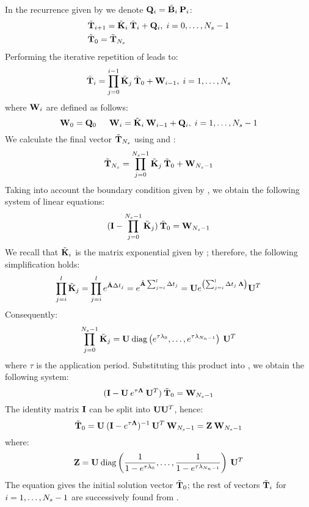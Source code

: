 In the recurrence given by  we denote $\mathbf{Q}_i = \tilde{\mathbf{B}}_i \:
\mathbf{P}_i$:
\begin{align}
  & \tv{T}_{i + 1} = \tm{K}_i \: \tv{T}_i + \m{Q}_i, \; i = \range{0}{N_s - 1} \elab{ce-recurrent} \\
  & \tv{T}_0 = \tv{T}_{N_s} \nonumber
\end{align}
Performing the iterative repetition of  leads to:
\begin{equation} \elab{y-recurrent}
  \tv{T}_i = \prod_{j = 0}^{i - 1} \tm{K}_j \: \tv{T}_0 + \m{W}_{i - 1}, \; i = \range{1}{N_s}
\end{equation}
where $\mathbf{W}_i$ are defined as follows:
\begin{equation}
  \m{W}_0 = \m{Q}_0 \hspace{15pt} \m{W}_i = \tm{K}_i \: \m{W}_{i - 1} + \m{Q}_i, \; i = \range{1}{N_s - 1} \elab{p-recurrent}
\end{equation}
We calculate the final vector $\tilde{\mathbf{T}}_{N_s}$ using  and
:
\[
  \tilde{\mathbf{T}}_{N_s} = \prod_{j = 0}^{N_s - 1} \tilde{\mathbf{K}}_j \: \tilde{\mathbf{T}}_0 + \mathbf{W}_{N_s - 1}
\]
Taking into account the boundary condition given by ,
we obtain the following system of linear equations:
\begin{equation} \elab{core-system}
  (\m{I} - \prod_{j = 0}^{N_s - 1} \tm{K}_j) \: \tv{T}_0 = \m{W}_{N_s - 1}
\end{equation}
We recall that $\tilde{\mathbf{K}}_i$ is the matrix exponential given by
; therefore, the following simplification holds:
\[
  \prod_{j = i}^l \tilde{\mathbf{K}}_j = \prod_{j = i}^l e^{\tilde{\mathbf{A}} \Delta t_j} = e^{\tilde{\mathbf{A}} \sum_{j = i}^l \Delta t_j} = \mathbf{U} e^{\left( \sum_{j = i}^l \Delta t_j \: \mathbf{\Lambda} \right)} \mathbf{U}^T
\]
Consequently:
\[
  \prod_{j = 0}^{N_s - 1} \tilde{\mathbf{K}}_j = \mathbf{U} \: \mathrm{diag}\left(e^{\tau \lambda_0}, \dots, e^{\tau \lambda_{N_n - 1}}\right) \: \mathbf{U}^T
\]
where $\tau$ is the application period. Substituting this product into
, we obtain the following system:
\[
  (\mathbf{I} - \mathbf{U} \: e^{\tau \mathbf{\Lambda}} \: \mathbf{U}^T) \: \tilde{\mathbf{T}}_0 = \mathbf{W}_{N_s - 1}
\]
The identity matrix $\mathbf{I}$ can be split into $\mathbf{U} \mathbf{U}^T$, hence:
\begin{equation} \elab{t0}
  \tv{T}_0 = \m{U} \: (\m{I} - e^{\tau \m{\Lambda}})^{-1} \: \m{U}^T \: \m{W}_{N_s - 1} = \m{Z} \: \m{W}_{N_s - 1}
\end{equation}
where:
\[
  \mathbf{Z} = \mathbf{U} \: \mathrm{diag}\left(\frac{1}{1 - e^{\tau \lambda_0}}, \dots, \frac{1}{1 - e^{\tau \lambda_{N_n - 1}}}\right) \: \mathbf{U}^T
\]
The equation gives the initial solution vector $\tilde{\mathbf{T}}_0$; the rest of vectors
$\tilde{\mathbf{T}}_i$ for $i = 1, \dots, N_s - 1$ are successively found from
.

